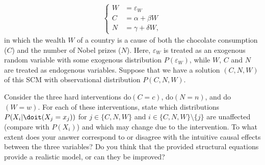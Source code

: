 \begin{enumerate}[label=9.\arabic*]
    \begin{align*}
        \begin{cases}
            W & = \varepsilon_W      \\
            C & = \alpha + \beta W   \\
            N & = \gamma + \delta W,
        \end{cases}
    \end{align*}
    in which the wealth $W$ of a country is a cause of both the chocolate consumption ($C$) and the number of Nobel prizes ($N$).
    Here, $\varepsilon_W$ is treated as an exogenous random variable with some exogenous distribution $P(\varepsilon_W)$, while $W$, $C$ and $N$ are treated as endogenous variables. Suppose that we have a solution $(C, N, W)$ of this SCM with observational distribution $P(C, N, W)$.


    Consider the three hard interventions do$(C = c)$, do$(N = n)$, and do$(W = w)$. For each of these interventions, state which distributions $P(X_i |\doit(X_j=x_j))$ for $j \in \{C, N, W\}$ and $i\in \{C, N, W\}\setminus \{j\}$ are unaffected (compare with $P(X_i)$) and which may change due to the intervention. To what extent does your answer correspond to or disagree with the intuitive causal effects between the three variables? Do you think that the provided structural equations provide a realistic model, or can they be improved?


\end{enumerate}
